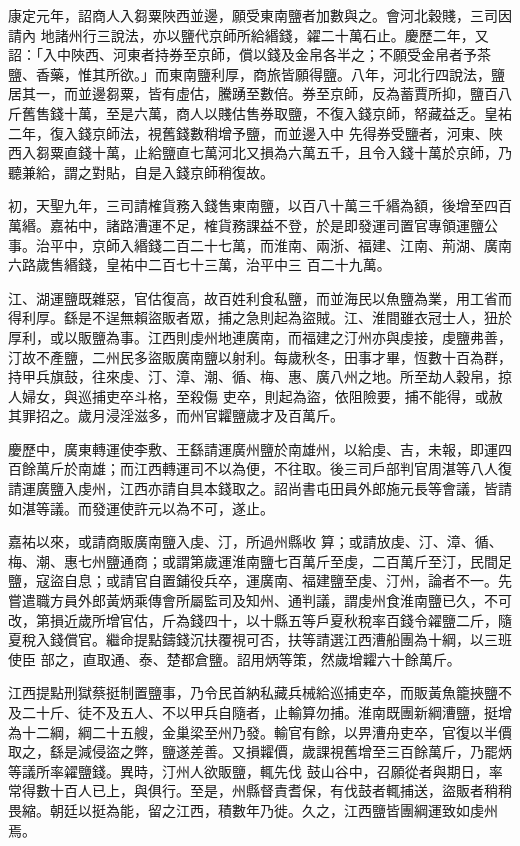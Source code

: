 \begin{pinyinscope}
 康定元年，詔商人入芻粟陜西並邊，願受東南鹽者加數與之。會河北穀賤，三司因請內
 地諸州行三說法，亦以鹽代京師所給緡錢，糴二十萬石止。慶歷二年，又詔：「入中陜西、河東者持券至京師，償以錢及金帛各半之；不願受金帛者予茶鹽、香藥，惟其所欲。」而東南鹽利厚，商旅皆願得鹽。八年，河北行四說法，鹽居其一，而並邊芻粟，皆有虛估，騰踴至數倍。券至京師，反為蓄賈所抑，鹽百八斤舊售錢十萬，至是六萬，商人以賤估售券取鹽，不復入錢京師，帑藏益乏。皇祐二年，復入錢京師法，視舊錢數稍增予鹽，而並邊入中
 先得券受鹽者，河東、陜西入芻粟直錢十萬，止給鹽直七萬河北又損為六萬五千，且令入錢十萬於京師，乃聽兼給，謂之對貼，自是入錢京師稍復故。



 初，天聖九年，三司請榷貨務入錢售東南鹽，以百八十萬三千緡為額，後增至四百萬緡。嘉祐中，諸路漕運不足，榷貨務課益不登，於是即發運司置官專領運鹽公事。治平中，京師入緡錢二百二十七萬，而淮南、兩浙、福建、江南、荊湖、廣南六路歲售緡錢，皇祐中二百七十三萬，治平中三
 百二十九萬。



 江、湖運鹽既雜惡，官估復高，故百姓利食私鹽，而並海民以魚鹽為業，用工省而得利厚。繇是不逞無賴盜販者眾，捕之急則起為盜賊。江、淮間雖衣冠士人，狃於厚利，或以販鹽為事。江西則虔州地連廣南，而福建之汀州亦與虔接，虔鹽弗善，汀故不產鹽，二州民多盜販廣南鹽以射利。每歲秋冬，田事才畢，恆數十百為群，持甲兵旗鼓，往來虔、汀、漳、潮、循、梅、惠、廣八州之地。所至劫人穀帛，掠人婦女，與巡捕吏卒斗格，至殺傷
 吏卒，則起為盜，依阻險要，捕不能得，或赦其罪招之。歲月浸淫滋多，而州官糶鹽歲才及百萬斤。



 慶歷中，廣東轉運使李敷、王繇請運廣州鹽於南雄州，以給虔、吉，未報，即運四百餘萬斤於南雄；而江西轉運司不以為便，不往取。後三司戶部判官周湛等八人復請運廣鹽入虔州，江西亦請自具本錢取之。詔尚書屯田員外郎施元長等會議，皆請如湛等議。而發運使許元以為不可，遂止。



 嘉祐以來，或請商販廣南鹽入虔、汀，所過州縣收
 算；或請放虔、汀、漳、循、梅、潮、惠七州鹽通商；或謂第歲運淮南鹽七百萬斤至虔，二百萬斤至汀，民間足鹽，寇盜自息；或請官自置鋪役兵卒，運廣南、福建鹽至虔、汀州，論者不一。先嘗遣職方員外郎黃炳乘傳會所屬監司及知州、通判議，謂虔州食淮南鹽已久，不可改，第損近歲所增官估，斤為錢四十，以十縣五等戶夏秋稅率百錢令糴鹽二斤，隨夏稅入錢償官。繼命提點鑄錢沉扶覆視可否，扶等請選江西漕船團為十綱，以三班使臣
 部之，直取通、泰、楚都倉鹽。詔用炳等策，然歲增糶六十餘萬斤。



 江西提點刑獄蔡挺制置鹽事，乃令民首納私藏兵械給巡捕吏卒，而販黃魚籠挾鹽不及二十斤、徒不及五人、不以甲兵自隨者，止輸算勿捕。淮南既團新綱漕鹽，挺增為十二綱，綱二十五艘，金巢梁至州乃發。輸官有餘，以畀漕舟吏卒，官復以半價取之，繇是減侵盜之弊，鹽遂差善。又損糶價，歲課視舊增至三百餘萬斤，乃罷炳等議所率糴鹽錢。異時，汀州人欲販鹽，輒先伐
 鼓山谷中，召願從者與期日，率常得數十百人已上，與俱行。至是，州縣督責耆保，有伐鼓者輒捕送，盜販者稍稍畏縮。朝廷以挺為能，留之江西，積數年乃徙。久之，江西鹽皆團綱運致如虔州焉。




\end{pinyinscope}
